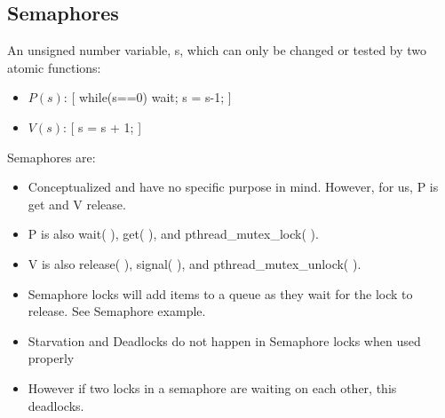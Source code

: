 \documentclass[fontsize=5pt]{scrartcl}
\begin{document}
\begin{multicols}{3}
\begin{itemize}
       \end{itemize}
       \subsection{Semaphores}
         An unsigned number variable, s, which can only be changed or tested by two atomic functions:
         \begin{itemize}
          \item $P(s)$: [ while(s==0) {wait}; s = s-1; ]
          \item $V(s)$: [ s = s + 1; ]
         \end{itemize}
         Semaphores are:
         \begin{itemize}
          \item Conceptualized and have no specific purpose in mind. However, for us, P is get and
                V release.
          \item P is also wait( ), get( ), and pthread\_mutex\_lock( ).
          \item V is also release( ), signal( ), and pthread\_mutex\_unlock( ).
          \item Semaphore locks will add items to a queue as they wait for the lock to release. See Semaphore example.
          \item Starvation and Deadlocks do not happen in Semaphore locks when used properly
          \item However if two locks in a semaphore are waiting on each other, this deadlocks.
        \end{itemize}
        


\end{multicols}
\end{document}

